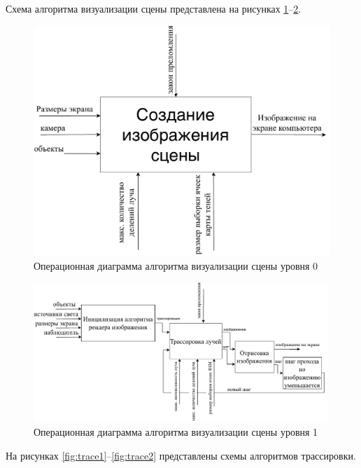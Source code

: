 {    Схема алгоритма визуализации сцены представлена на рисунках \ref{fig:idef0}--\ref{fig:idef1}.
    \begin{figure}[H]
    	\centering
    	\includegraphics[height=0.3\textheight]{img/idef0.pdf}
    	\caption{Операционная диаграмма алгоритма визуализации сцены уровня 0}
    	\label{fig:idef0}
    \end{figure}
    
    \begin{figure}[H]
    	\centering
        \includegraphics[width=0.99\textwidth]{img/idef1.pdf}
    	\caption{Операционная диаграмма алгоритма визуализации сцены уровня 1}
    	\label{fig:idef1}
    \end{figure}

    На рисунках \ref{fig:trace1}--\ref{fig:trace2} представлены
    схемы алгоритмов трассировки.

}
